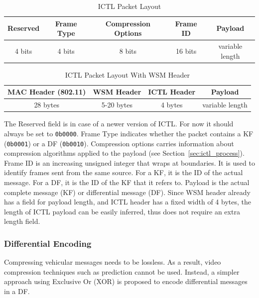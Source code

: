 \documentclass[12pt]{report}
\begin{document}
\begin{table}[h]
  \begin{center}
    \begin{tabular}{|c|c|c|c|c|}
      \hline
      Reserved & Frame Type & Compression Options & Frame ID & Payload \\\hline
      4 bits   &  4 bits    & 8 bits              & 16 bits  & variable length \\\hline
    \end{tabular}
    \caption{\label{tab:ictl_layout}ICTL Packet Layout}
  \end{center}
\end{table}
\begin{table}[h]
  \begin{center}
    \begin{tabular}{|c|c|c|c|}
      \hline
      MAC Header (802.11) & WSM Header & ICTL Header & Payload \\\hline
      28 bytes            & 5-20 bytes & 4 bytes     &  variable length \\\hline
    \end{tabular}
    \caption{\label{tab:ictl_layout_wsm}ICTL Packet Layout With WSM Header}
  \end{center}
\end{table}

The Reserved field is in case of a newer version of ICTL. For now it should always be set to \texttt{0b0000}. Frame Type indicates whether the packet contains a KF (\texttt{0b0001}) or a DF (\texttt{0b0010}). Compression options carries information about compression algorithms applied to the payload (see Section~\ref{sec:ictl_process}). Frame ID is an increasing unsigned integer that wraps at boundaries. It is used to identify frames sent from the same source. For a KF, it is the ID of the actual message. For a DF, it is the ID of the KF that it refers to. Payload is the actual complete message (KF) or differential message (DF). Since WSM header already has a field for payload length, and ICTL header has a fixed width of 4 bytes, the length of ICTL payload can be easily inferred, thus does not require an extra length field.

\subsubsection{Differential Encoding}
\label{sec:ictl_diff}

Compressing vehicular messages needs to be lossless. As a result, video compression techniques such as prediction cannot be used. Instead, a simpler approach using Exclusive Or (XOR) is proposed to encode differential messages in a DF.
\end{document}
